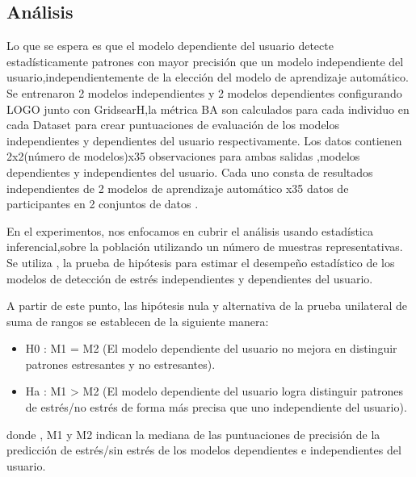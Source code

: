 \subsection{Análisis}

Lo que se espera es que el modelo dependiente del usuario detecte estadísticamente patrones con mayor precisión que un modelo  independiente del usuario,independientemente  de la elección del modelo de aprendizaje automático.
Se entrenaron 2 modelos independientes y 2 modelos dependientes  configurando LOGO junto con  GridsearH,la métrica  BA son calculados para cada individuo en cada Dataset para crear puntuaciones de evaluación de los modelos independientes y dependientes del usuario respectivamente.
Los datos contienen 2x2(número de modelos)x35 observaciones para ambas salidas ,modelos dependientes y independientes del usuario.
Cada uno consta de resultados independientes  de 2 modelos de aprendizaje automático x35 datos de participantes en 2 conjuntos de datos .

En el  experimentos, nos  enfocamos  en cubrir el análisis usando  estadística inferencial,sobre la población utilizando  un número de  muestras representativas. Se utiliza , la prueba de hipótesis  para estimar el desempeño estadístico de los modelos de detección de estrés  independientes y dependientes del usuario.

 A partir de este punto, las hipótesis nula y alternativa de la prueba unilateral de suma de rangos se 
establecen de la siguiente manera:
\begin{itemize}
    \item  H0 : M1 = M2 (El modelo dependiente del usuario no mejora en distinguir patrones estresantes y no estresantes).
    \item Ha : M1 > M2 (El modelo dependiente del usuario logra distinguir patrones de estrés/no estrés
 de forma  más precisa que uno independiente del usuario).
\end{itemize}

donde , M1 y M2 indican la mediana de las puntuaciones de precisión de la predicción 
de estrés/sin estrés de los modelos dependientes e independientes del usuario.






